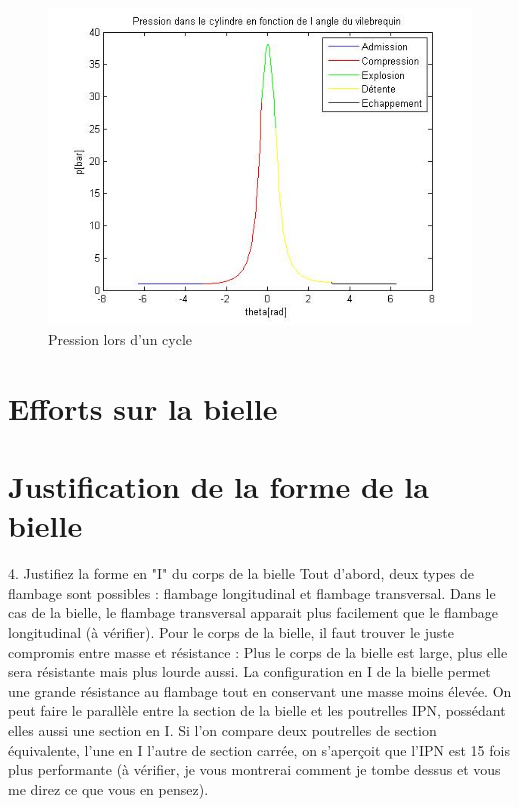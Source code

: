 \documentclass[a4paper,oneside,12pt]{report}
\begin{document}
\begin{figure}[H]
	\center
	\includegraphics[scale=0.7]{pression.jpg}
	\caption{Pression lors d'un cycle}
\end{figure}

\section{Efforts sur la bielle}



\section{Justification de la forme de la bielle}
4. Justifiez la forme en "I" du corps de la bielle
Tout d'abord, deux types de flambage sont possibles : flambage longitudinal et flambage transversal. Dans le cas de la bielle, le flambage transversal apparait plus facilement que le flambage longitudinal (à vérifier). Pour le corps de la bielle, il faut trouver le juste compromis entre masse et résistance : Plus le corps de la bielle est large, plus elle sera résistante mais plus lourde aussi. La configuration en I de la bielle permet une grande résistance au flambage tout en conservant une masse moins élevée. On peut faire le parallèle entre la section de la bielle et les poutrelles IPN, possédant elles aussi une section en I. Si l'on compare deux poutrelles de section équivalente, l'une en I l'autre de section carrée, on s'aperçoit que l'IPN est 15 fois plus performante (à vérifier, je vous montrerai comment je tombe dessus et vous me direz ce que vous en pensez).
\end{document}
